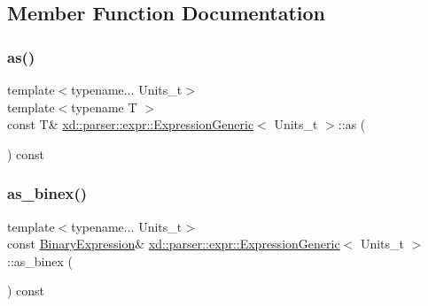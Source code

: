 \subsection{Member Function Documentation}
\mbox{\label{structxd_1_1parser_1_1expr_1_1_expression_generic_a84ba793388ecd438f862673e80287e6d}} 
\subsubsection{\texorpdfstring{as()}{as()}}
{\footnotesize\ttfamily template$<$typename... Units\+\_\+t$>$ \\
template$<$typename T $>$ \\
const T\& \mbox{\hyperlink{structxd_1_1parser_1_1expr_1_1_expression_generic}{xd\+::parser\+::expr\+::\+Expression\+Generic}}$<$ Units\+\_\+t $>$\+::as (\begin{DoxyParamCaption}{ }\end{DoxyParamCaption}) const\hspace{0.3cm}{\ttfamily [inline]}}

\mbox{\label{structxd_1_1parser_1_1expr_1_1_expression_generic_abf73f347c0ae244db1670568646a97a8}} 
\subsubsection{\texorpdfstring{as\+\_\+binex()}{as\_binex()}}
{\footnotesize\ttfamily template$<$typename... Units\+\_\+t$>$ \\
const \mbox{\hyperlink{structxd_1_1parser_1_1expr_1_1_expression_generic_a2bc00be3a5e572a1bee429bcda5943d8}{Binary\+Expression}}\& \mbox{\hyperlink{structxd_1_1parser_1_1expr_1_1_expression_generic}{xd\+::parser\+::expr\+::\+Expression\+Generic}}$<$ Units\+\_\+t $>$\+::as\+\_\+binex (\begin{DoxyParamCaption}{ }\end{DoxyParamCaption}) const\hspace{0.3cm}{\ttfamily [inline]}}


